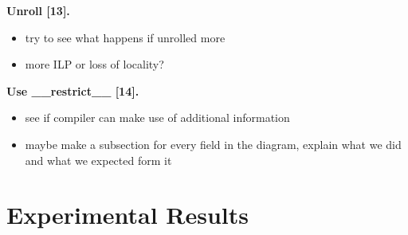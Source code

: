 \documentclass[letterpaper]{article}
\newcommand{\mypar}[1]{{\bf #1.}}
\begin{document}
\mypar{Unroll [13]}
\begin{itemize}
\item try to see what happens if unrolled more
\item more ILP or loss of locality?
\end{itemize}

\mypar{Use \_\_restrict\_\_ [14]}
\begin{itemize}
\item see if compiler can make use of additional information
\end{itemize}

%
%
%
%

\begin{itemize}
\item maybe make a subsection for every field in the diagram, explain what we did and what we expected form it
\end{itemize}

\section{Experimental Results}\label{sec:exp}
\end{document}

